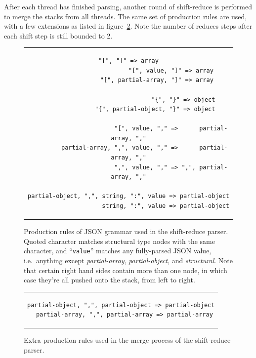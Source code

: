 \documentclass[11pt]{article}
\begin{document}
After each thread has finished parsing, another round of shift-reduce is performed to merge the stacks from all threads. The same set of production rules are used, with a few extensions as listed in figure~\ref{fig:shift-reduce-merge-rules}. Note the number of reduces steps after each shift step is still bounded to 2.

\begin{figure}
\lstset{language=[json]EBNF}
\centering\begin{tabular}{c}  %
\begin{lstlisting}[morekeywords={partial-array,partial-object}]
                               "[", "]" => array
                        "[", value, "]" => array
                "[", partial-array, "]" => array

                               "{", "}" => object
               "{", partial-object, "}" => object

                        "[", value, "," =>      partial-array, ","
         partial-array, ",", value, "," =>      partial-array, ","
                        ",", value, "," => ",", partial-array, ","

partial-object, ",", string, ":", value => partial-object
                     string, ":", value => partial-object
\end{lstlisting}
\end{tabular}
\caption{Production rules of JSON grammar used in the shift-reduce parser. Quoted character matches structural type nodes with the same character, and ``\texttt{value}'' matches any fully-parsed JSON value, i.e.\ anything except \textit{partial-array}, \textit{partial-object}, and \textit{structural}. Note that certain right hand sides contain more than one node, in which case they're all pushed onto the stack, from left to right.}
\label{fig:shift-reduce-rules}
\end{figure}

\begin{figure}
\centering\begin{tabular}{c}  %
\lstset{language=[json]EBNF}
\begin{lstlisting}[morekeywords={partial-array,partial-object}]
partial-object, ",", partial-object => partial-object
  partial-array, ",", partial-array => partial-array
\end{lstlisting}
\end{tabular}
\caption{Extra production rules used in the merge process of the shift-reduce parser.}
\label{fig:shift-reduce-merge-rules}
\end{figure}
\end{document}

